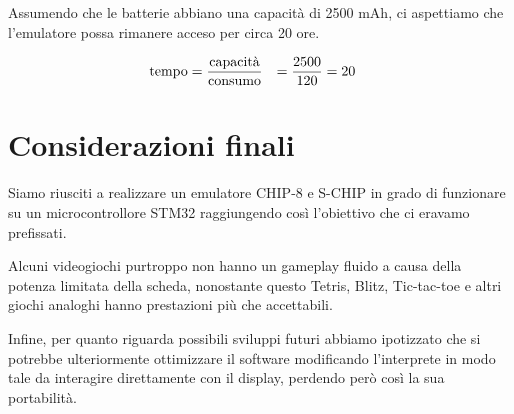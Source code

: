 \documentclass[a4paper]{article}
\begin{document}
Assumendo che le batterie abbiano una capacità di 2500 mAh, ci aspettiamo che
l'emulatore possa rimanere acceso per circa 20 ore.

\begin{equation*}
    \begin{aligned}
        \textmd{tempo} & = \frac{\textmd{capacità}}{\textmd{consumo}} & = \frac{2500}{120} & = 20
    \end{aligned}
\end{equation*}

\section{Considerazioni finali}

Siamo riusciti a realizzare un emulatore CHIP-8 e S-CHIP in grado di funzionare su un
microcontrollore STM32 raggiungendo così l'obiettivo che ci eravamo prefissati.

Alcuni videogiochi purtroppo non hanno un gameplay fluido a causa della potenza
limitata della scheda, nonostante questo Tetris, Blitz, Tic-tac-toe e altri giochi
analoghi hanno prestazioni più che accettabili.

Infine, per quanto riguarda possibili sviluppi futuri abbiamo ipotizzato che si potrebbe
ulteriormente ottimizzare il software modificando l'interprete in modo tale da interagire
direttamente con il display, perdendo però così la sua portabilità.

\clearpage




\clearpage
\end{document}
